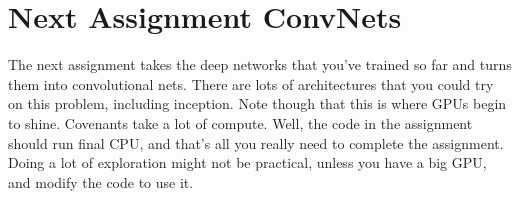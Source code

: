 \documentclass{article}
\begin{document}
\section{Next Assignment ConvNets}
The next assignment takes the deep
networks that you've trained so
far and
turns them into convolutional nets.
There are lots of architectures
that you could try on this problem,
including inception.
Note though that this is
where GPUs begin to shine.
Covenants take a lot of compute.
Well, the code in the assignment
should run final CPU,
and that's all you really need
to complete the assignment.
Doing a lot of exploration might not be
practical, unless you have a big GPU,
and modify the code to use it.
\end{document}

